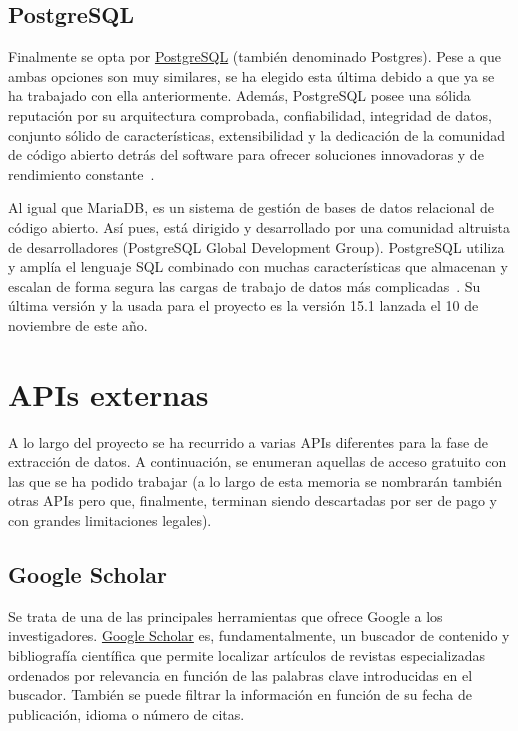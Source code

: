 \subsection{PostgreSQL}
Finalmente se opta por \href{https://www.postgresql.org/}{PostgreSQL} (también denominado Postgres). Pese a que ambas opciones son muy similares, se ha elegido esta última debido a que ya se ha trabajado con ella anteriormente. Además, PostgreSQL posee una sólida reputación por su arquitectura comprobada, confiabilidad, integridad de datos, conjunto sólido de características, extensibilidad y la dedicación de la comunidad de código abierto detrás del software para ofrecer soluciones innovadoras y de rendimiento constante~\cite{Postgresql.org}.

Al igual que MariaDB, es un sistema de gestión de bases de datos relacional de código abierto. Así pues, está dirigido y desarrollado por una comunidad altruista de desarrolladores (PostgreSQL Global Development Group).
PostgreSQL utiliza y amplía el lenguaje SQL combinado con muchas características que almacenan y escalan de forma segura las cargas de trabajo de datos más complicadas~\cite{Postgresql.org}. 
Su última versión y la usada para el proyecto es la versión 15.1 lanzada el 10 de noviembre de este año.

\section{APIs externas}
A lo largo del proyecto se ha recurrido a varias APIs diferentes para la fase de extracción de datos. A continuación, se enumeran aquellas de acceso gratuito con las que se ha podido trabajar (a lo largo de esta memoria se nombrarán también otras APIs pero que, finalmente, terminan siendo descartadas por ser de pago y con grandes limitaciones legales).

\subsection{Google Scholar}
Se trata de una de las principales herramientas que ofrece Google a los investigadores. \href{https://scholar.google.com/}{Google Scholar} es, fundamentalmente, un buscador de contenido y bibliografía científica que permite localizar artículos de revistas especializadas ordenados por relevancia en función de las palabras clave introducidas en el buscador. También se puede  filtrar la información en función de su fecha de publicación, idioma o número de citas.

